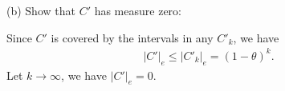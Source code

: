 \documentclass[UTF8,a4paper,10pt]{article}
\begin{document}
\begin{solution}
  \dotfill

  (b) Show that \(C'\) has measure
  zero:

  Since \(C'\) is covered by the intervals in any \(C'_k\), we have
  \begin{equation*}
    \begin{aligned}
      \left\lvert C'\right\rvert_e \leq \left\lvert C'_k \right\rvert_e = \left(1-\theta\right)^{k}.
    \end{aligned}
  \end{equation*}
  Let \(k\to\infty\), we have \(\left\lvert C'\right\rvert_e = 0\).

\end{solution}
\end{document}
